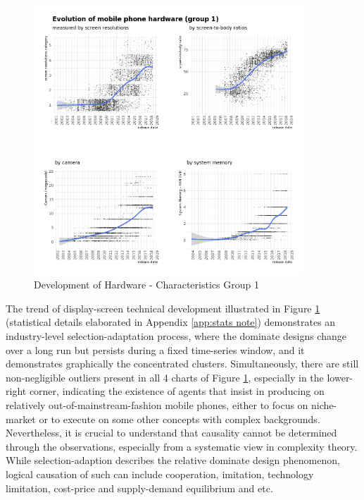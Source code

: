 \documentclass[utf8,english]{gradu3}
\begin{document}
\begin{figure}[htb]
    \centering
    \includegraphics[width=0.90\textwidth]{evo1.png}
    \caption{Development of Hardware - Characteristics Group 1}
    \label{fig:screen resolutions}
\end{figure}

The trend of display-screen technical development illustrated in Figure \ref{fig:screen resolutions} (statistical details elaborated in Appendix \ref{app:stats note}) demonstrates an industry-level selection-adaptation process, where the dominate designs change over a long run but persists during a fixed time-series window, and it demonstrates graphically the concentrated clusters. Simultaneously, there are still non-negligible outliers present in all 4 charts of Figure \ref{fig:screen resolutions}, especially in the lower-right corner, indicating the existence of agents that insist in producing on relatively out-of-mainstream-fashion mobile phones, either to focus on niche-market or to execute on some other concepts with complex backgrounds. Nevertheless, it is crucial to understand that causality cannot be determined through the observations, especially from a systematic view in complexity theory. While selection-adaption describes the relative dominate design phenomenon, logical causation of such can include cooperation, imitation, technology limitation, cost-price and supply-demand equilibrium and etc. 
\end{document}
